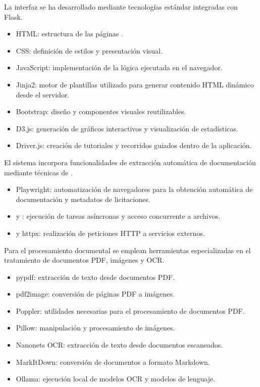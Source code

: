 La interfaz  se ha desarrollado mediante tecnologías estándar integradas con Flask.

\begin{itemize}
\tightlist
	\item HTML: estructura de las páginas .
	\item CSS: definición de estilos y presentación visual.
	\item JavaScript: implementación de la lógica ejecutada en el navegador.
	\item Jinja2: motor de plantillas utilizado para generar contenido HTML dinámico desde el servidor.
	\item Bootstrap: diseño  y componentes visuales reutilizables.
	\item D3.js: generación de gráficos interactivos y visualización de estadísticas.
	\item Driver.js: creación de tutoriales y recorridos guiados dentro de la aplicación.
\end{itemize}

El sistema incorpora funcionalidades de extracción automática de documentación mediante técnicas de .

\begin{itemize}
\tightlist
	\item Playwright: automatización de navegadores  para la obtención automática de documentación y metadatos de licitaciones.
	\item {} y : ejecución de tareas asíncronas y acceso concurrente a archivos.
	\item {} y httpx: realización de peticiones HTTP a servicios externos.
\end{itemize}

Para el procesamiento documental se emplean herramientas especializadas en el tratamiento de documentos PDF, imágenes y OCR.

\begin{itemize}
\tightlist
	\item pypdf: extracción de texto desde documentos PDF.
	\item pdf2image: conversión de páginas PDF a imágenes.
	\item Poppler: utilidades necesarias para el procesamiento de documentos PDF.
	\item Pillow: manipulación y procesamiento de imágenes.
	\item Nanonets OCR: extracción de texto desde documentos escaneados.
	\item MarkItDown: conversión de documentos a formato Markdown.
	\item Ollama: ejecución local de modelos OCR y modelos de lenguaje.
\end{itemize}


